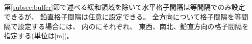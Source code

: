 \subsection{\SubsecGridIntvSettng} \label{subsec:gridinterv}

第\ref{subsec:buffer}節で述べる緩和領域を除いて水平格子間隔は等間隔でのみ設定できるが、
鉛直格子間隔は任意に設定できる。
全方向について格子間隔を等間隔で設定する場合には、
内のにそれぞれ、
東西、南北、鉛直方向の格子間隔を指定する(単位は[m])。

